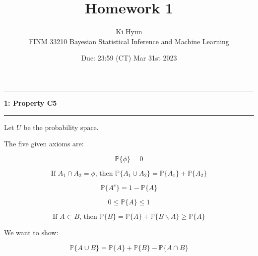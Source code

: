 \documentclass[11pt]{article}
\newcommand\question[2]{\vspace{.25in}\hrule\textbf{#1: #2}\vspace{.5em}\hrule\vspace{.10in}}
\renewcommand\part[1]{\vspace{.10in}\textbf{(#1)}}
\renewcommand{\P}{\mathbb{P}}
\begin{document}
\raggedright


\newcommand\NAME{Ki Hyun}  %
\newcommand\ClassNumber{FINM 33210}
\newcommand\ClassName{Bayesian Statistical Inference and Machine Learning}    
\newcommand\HWNUM{1}              %
\newcommand\duedate{23:59 (CT) Mar 31st 2023}	%

\title{Homework \HWNUM}
\author{\NAME \\ 
\ClassNumber \text{:} \ClassName}
\date{Due: \duedate}

\maketitle


\question{1}{Property C5}

Let $U$ be the probability space.

The five given axioms are:

\begin{equation} \tag{C0}
\P\{\phi\} = 0
\end{equation}

\begin{equation} \tag{C1}
\text{If } A_1 \cap A_2 = \phi
\text{, then }
\P\{A_1 \cup A_2\} = \P\{A_1\} + \P\{A_2\}
\end{equation}

\begin{equation} \tag{C2}
\P\{A^c\} = 1 - \P\{A\}
\end{equation}

\begin{equation} \tag{C3}
0 \leq \P\{A\} \leq 1
\end{equation}

\begin{equation} \tag{C4}
\text{If } A \subset B
\text{, then }
\P\{B\} = \P\{A\} + \P\{B \backslash A\} \geq \P\{A\}
\end{equation}

We want to show:

\begin{equation} \tag{C5}
\P\{A \cup B\} = \P\{A\} + \P\{B\} - \P\{A \cap B\}
\end{equation}
\end{document}
